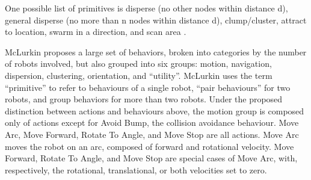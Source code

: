 \documentclass[]{article}
\begin{document}
One possible list of primitives is disperse (no other nodes within distance d), general disperse (no more than n nodes within distance d), clump/cluster, attract to location, swarm in a direction, and scan area \cite{evans2000programming}.

McLurkin proposes a large set of behaviors, broken into categories by the number of robots involved, but also grouped into six groups: motion, navigation, dispersion, clustering, orientation, and ``utility''\cite{mclurkin2004stupid}.
McLurkin uses the term ``primitive'' to refer to behaviours of a single robot, ``pair behaviours'' for two robots, and group behaviors for more than two robots. 
Under the proposed distinction between actions and behaviours above, the motion group is composed only of actions except for Avoid Bump, the collision avoidance behaviour. Move Arc, Move Forward, Rotate To Angle, and Move Stop are all actions. 
Move Arc moves the robot on an arc, composed of forward and rotational velocity. Move Forward, Rotate To Angle, and Move Stop are special cases of Move Arc, with, respectively, the rotational, translational, or both velocities set to zero. 
 
\end{document}
